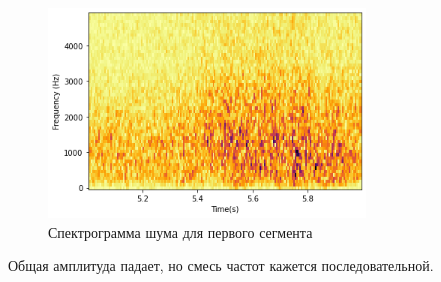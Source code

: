 \documentclass[a4paper, 12pt]{report}
\begin{document}
	\begin{figure}[H]
		\centering
		\includegraphics[width=0.75\textwidth]{test3.png}
		\caption{Спектрограмма шума для первого сегмента}
		\label{fig:test3}
	\end{figure}
	Общая амплитуда падает, но смесь частот кажется последовательной.
\end{document}
